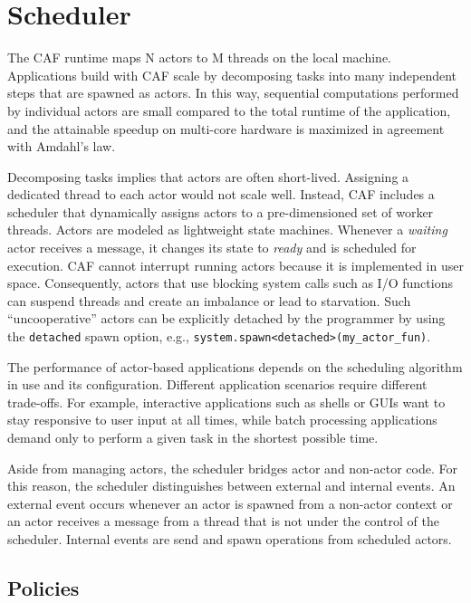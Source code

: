 \section{Scheduler}
\label{scheduler}

The CAF runtime maps N actors to M threads on the local machine. Applications
build with CAF scale by decomposing tasks into many independent steps that are
spawned as actors. In this way, sequential computations performed by individual
actors are small compared to the total runtime of the application, and the
attainable speedup on multi-core hardware is maximized in agreement with
Amdahl's law.

Decomposing tasks implies that actors are often short-lived. Assigning a
dedicated thread to each actor would not scale well. Instead, CAF includes a
scheduler that dynamically assigns actors to a pre-dimensioned set of worker
threads. Actors are modeled as lightweight state machines. Whenever a
\emph{waiting} actor receives a message, it changes its state to \emph{ready}
and is scheduled for execution. CAF cannot interrupt running actors because it
is implemented in user space. Consequently, actors that use blocking system
calls such as I/O functions can suspend threads and create an imbalance or lead
to starvation. Such ``uncooperative'' actors can be explicitly detached by the
programmer by using the \lstinline^detached^ spawn option, e.g.,
\lstinline^system.spawn<detached>(my_actor_fun)^.

The performance of actor-based applications depends on the scheduling algorithm
in use and its configuration. Different application scenarios require different
trade-offs. For example, interactive applications such as shells or GUIs want
to stay responsive to user input at all times, while batch processing
applications demand only to perform a given task in the shortest possible time.

Aside from managing actors, the scheduler bridges actor and non-actor code. For
this reason, the scheduler distinguishes between external and internal events.
An external event occurs whenever an actor is spawned from a non-actor context
or an actor receives a message from a thread that is not under the control of
the scheduler. Internal events are send and spawn operations from scheduled
actors.

\subsection{Policies}
\label{scheduler-policy}

